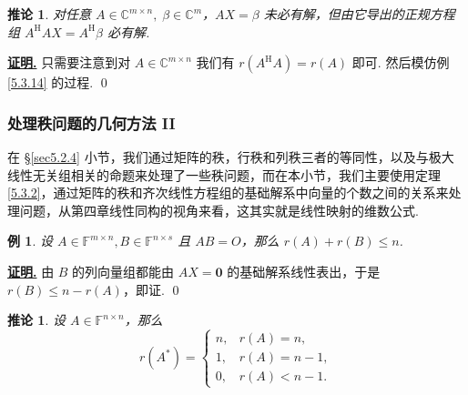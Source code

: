 \documentclass[10pt,openany]{article}
\theoremstyle{thmstyle} %
\theoremstyle{defstyle} %
\newtheorem{corollary}[theorem]{推论}
\theoremstyle{prostyle} %
\theoremstyle{exastyle}
\newtheorem{example}[theorem]{例}
\theoremstyle{remstyle}
\renewenvironment{proof}[1][证明]{\par\underline{\textbf{#1.}} \;\fangsong}{\qed\par}
\newcommand{\Her}{^{\text{H}}}
\newcommand{\F}{\mathbb{F}}
\newcommand{\C}{\mathbb{C}}
\newcommand{\n}{^{n \times n}}
\newcommand{\mn}{^{m \times n}}
\begin{document}
\begin{corollary}
	对任意 \( A \in \C^{m \times n}, \; \beta \in \C^m \)，\( AX=\beta \) 未必有解，但由它导出的正规方程组 \( A\Her AX=A\Her \beta \) 必有解.
\end{corollary}


\begin{proof}
	只需要注意到对 \( A \in \C\mn \) 我们有 \( r(A\Her A)=r(A)\) 即可. 然后模仿例 \ref{5.3.14} 的过程.
\end{proof}



\subsubsection{处理秩问题的几何方法 II}

在 \S \ref{sec5.2.4} 小节，我们通过矩阵的秩，行秩和列秩三者的等同性，以及与极大线性无关组相关的命题来处理了一些秩问题，而在本小节，我们主要使用定理 \ref{5.3.2}，通过矩阵的秩和齐次线性方程组的基础解系中向量的个数之间的关系来处理问题，从第四章线性同构的视角来看，这其实就是线性映射的维数公式.


\begin{example} \label{}
	设 \( A \in \F^{m \times n}, B \in \F^{n \times s} \) 且 \( AB=O \)，那么 \( r(A)+r(B) \leq n \).
\end{example}

\begin{proof}
	由 \( B \) 的列向量组都能由 \( AX=\bm{0} \) 的基础解系线性表出，于是 \( r(B) \leq n-r(A) \)，即证.
\end{proof}


\begin{corollary}
	设 \( A \in \F\n \)，那么
	\[ r(A^*)=\left\{ \begin{array}{ll}
		n, & r(A)=n, \\
		1, & r(A)=n-1, \\
		0, & r(A)<n-1.
	\end{array}\right. \]
\end{corollary}
\end{document}

